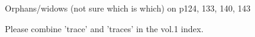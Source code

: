 
Orphans/widows (not sure which is which) on p124, 133, 140, 143

 

Please combine 'trace' and 'traces' in the vol.1 index.  
  

